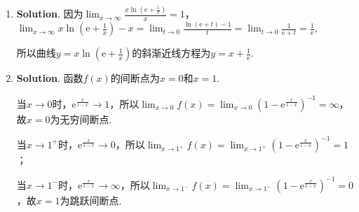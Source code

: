 \documentclass[../Main.tex]{subfiles}
\begin{document}
\begin{enumerate}
          因此$f^{(n)}(0)=(-1)^{n-1}\cdot n!\cdot 2^{n-1}$.

    \item \textbf{Solution}. 因为$\lim_{x\to\infty}\frac{x\ln\left(\mathrm{e}+\frac{1}{x}\right)}{x}
              =1$，$\lim_{x\to\infty}x\ln\left(\mathrm{e}+\frac{1}{x}\right)-x=\lim_{t\to0}
              \frac{\ln(\mathrm{e}+t)-1}{t}=\lim_{t\to0}\frac{1}{\mathrm{e}+t}= \frac{1}{\mathrm{e}}$,

          所以曲线$y=x\ln\left(\mathrm{e}+\frac{1}{x}\right)$的斜渐近线方程为$y=x+\frac{1}{\mathrm{e}}$.

    \item \textbf{Solution}. 函数$f(x)$的间断点为$x=0$和$x=1$.

          当$x\to0$时，$\mathrm{e}^{\frac{x}{1-x}}\to1$，所以$\lim_{x\to0}f(x)=\lim_{x\to0}
              \left(1-\mathrm{e}^{\frac{x}{1-x}}\right)^{-1}=\infty$，故$x=0$为无穷间断点.

          当$x\to1^{+}$时，$\mathrm{e}^{\frac{x}{1-x}}\to0$，所以$\lim_{x\to1^+}f(x)=
              \lim_{x\to1^+}\left(1-\mathrm{e}^{\frac{x}{1-x}}\right)^{-1}=1$；

          当$x\to1^{-}$时，$\mathrm{e}^{\frac{x}{1-x}}\to\infty$，所以$\lim_{x\to1^-}
              f(x)=\lim_{x\to1^-}\left(1-\mathrm{e}^{\frac{x}{1-x}}\right)^{-1}=0$，故$x=
              1$为跳跃间断点.
\end{enumerate}
\end{document}
